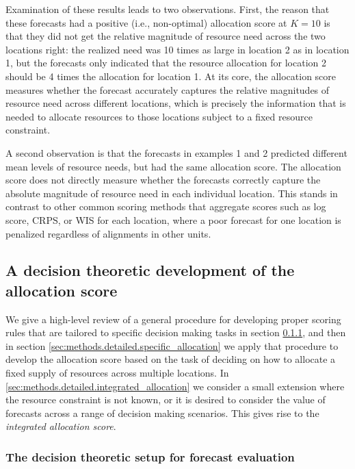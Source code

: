 \documentclass{article}
\begin{document}
Examination of these results leads to two observations. First, the reason that these forecasts had a positive (i.e.,
non-optimal) allocation score at $K=10$ is that they did not get the relative magnitude of resource need across the two
locations right: the realized need was 10 times as large in location 2 as in location 1, but the forecasts only
indicated that the resource allocation for location 2 should be 4 times the allocation for location 1. At its core, the
allocation score measures whether the forecast accurately captures the relative magnitudes of resource need across
different locations, which is precisely the information that is needed to allocate resources to those locations subject
to a fixed resource constraint.

A second observation is that the forecasts in examples 1 and 2 predicted different mean levels of resource needs, but
had the same allocation score. The allocation score does not directly measure whether the forecasts correctly capture
the absolute magnitude of resource need in each individual location. This stands in contrast to other common scoring
methods that aggregate scores such as log score, CRPS, or WIS for each location, where a poor forecast for one location
is penalized regardless of alignments in other units.

\subsection{A decision theoretic development of the allocation score}
\label{sec:methods.detailed}

We give a high-level review of a general procedure for developing proper scoring rules that are tailored to specific
decision making tasks in section \ref{sec:methods.detailed.decisiontheory}, and then in section
\ref{sec:methods.detailed.specific_allocation} we apply that procedure to develop the allocation score based on the task
of deciding on how to allocate a fixed supply of resources across multiple locations. In
\ref{sec:methods.detailed.integrated_allocation} we consider a small extension where the resource constraint is not
known, or it is desired to consider the value of forecasts across a range of decision making scenarios. This gives rise
to the \emph{integrated allocation score}.

\subsubsection{The decision theoretic setup for forecast evaluation}
\label{sec:methods.detailed.decisiontheory}
\end{document}
